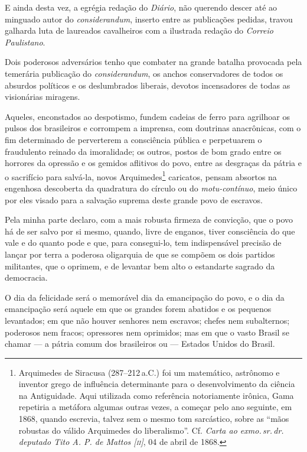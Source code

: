 E ainda desta vez, a egrégia redação do \emph{Diário}, não querendo
descer até ao minguado autor do \textit{considerandum}, inserto entre as
publicações pedidas, travou galharda luta de laureados cavalheiros com a
ilustrada redação do \emph{Correio Paulistano}.

Dois poderosos adversários tenho que combater na grande batalha
provocada pela temerária publicação do \textit{considerandum}, os anchos
conservadores de todos os absurdos políticos e os deslumbrados liberais,
devotos incensadores de todas as visionárias miragens.

Aqueles, enconstados ao despotismo, fundem cadeias de ferro para
agrilhoar os pulsos dos brasileiros e corrompem a imprensa, com
doutrinas anacrônicas, com o fim determinado de perverterem a
consciência pública e perpetuarem o fraudulento reinado da imoralidade;
os outros, postos de bom grado entre os horrores da opressão e os
gemidos aflitivos do povo, entre as desgraças da pátria e o sacrifício
para salvá-la, novos Arquimedes\footnote{Arquimedes de Siracusa (287--212\,a.C.) 
foi um matemático, astrônomo e inventor grego de
  influência determinante para o desenvolvimento da ciência na
  Antiguidade. Aqui utilizada como referência notoriamente irônica, Gama
  repetiria a metáfora algumas outras vezes, a começar pelo ano
  seguinte, em 1868, quando escrevia, talvez sem o mesmo tom sarcástico,
  sobre as ``mãos robustas do válido Arquimedes do liberalismo''. Cf.
  \emph{Carta ao exmo.\,sr.\,dr.\,deputado Tito A. P. de Mattos {[}\textsc{ii}{]}},
  04 de abril de 1868.\label{arquimedes}} caricatos, pensam absortos na engenhosa descoberta da
quadratura do círculo ou do \emph{motu-contínuo}, meio único por eles
visado para a salvação suprema deste grande povo de escravos.

Pela minha parte declaro, com a mais robusta firmeza de convicção, que o
povo há de ser salvo por si mesmo, quando, livre de enganos, tiver
consciência do que vale e do quanto pode e que, para consegui-lo, tem
indispensável precisão de lançar por terra a poderosa oligarquia de que
se compõem os dois partidos militantes, que o oprimem, e de levantar bem
alto o estandarte sagrado da democracia.

O dia da felicidade será o memorável dia da emancipação do povo, e o dia
da emancipação será aquele em que os grandes forem abatidos e os
pequenos levantados; em que não houver senhores nem escravos; chefes nem
subalternos; poderosos nem fracos; opressores nem oprimidos; mas em que
o vasto Brasil se chamar --- a pátria comum dos brasileiros ou --- Estados
Unidos do Brasil.

